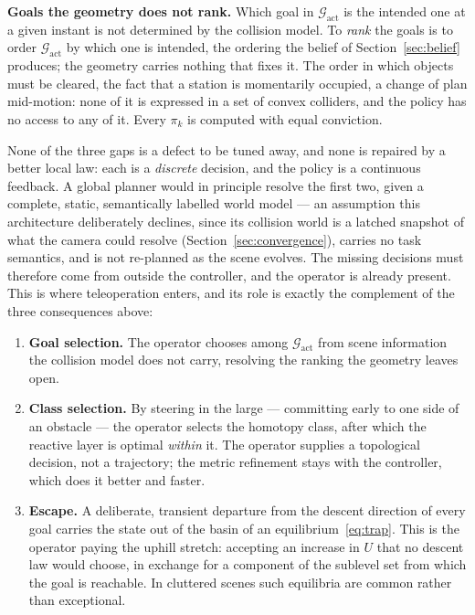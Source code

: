 \documentclass[12pt,a4paper,twoside,openright]{report}
\begin{document}
\textbf{Goals the geometry does not rank.} Which goal in $\mathcal{G}_{\text{act}}$ is the intended one at a given instant is not determined by the collision model. To \emph{rank} the goals is to order $\mathcal{G}_{\text{act}}$ by which one is intended, the ordering the belief of Section~\ref{sec:belief} produces; the geometry carries nothing that fixes it. The order in which objects must be cleared, the fact that a station is momentarily occupied, a change of plan mid-motion: none of it is expressed in a set of convex colliders, and the policy has no access to any of it. Every $\pi_k$ is computed with equal conviction.

None of the three gaps is a defect to be tuned away, and none is repaired by a better local law: each is a \emph{discrete} decision, and the policy is a continuous feedback. A global planner would in principle resolve the first two, given a complete, static, semantically labelled world model --- an assumption this architecture deliberately declines, since its collision world is a latched snapshot of what the camera could resolve (Section~\ref{sec:convergence}), carries no task semantics, and is not re-planned as the scene evolves. The missing decisions must therefore come from outside the controller, and the operator is already present. This is where teleoperation enters, and its role is exactly the complement of the three consequences above:
\begin{enumerate}[nosep]
\item \textbf{Goal selection.} The operator chooses among $\mathcal{G}_{\text{act}}$ from scene information the collision model does not carry, resolving the ranking the geometry leaves open.
\item \textbf{Class selection.} By steering in the large --- committing early to one side of an obstacle --- the operator selects the homotopy class, after which the reactive layer is optimal \emph{within} it. The operator supplies a topological decision, not a trajectory; the metric refinement stays with the controller, which does it better and faster.
\item \textbf{Escape.} A deliberate, transient departure from the descent direction of every goal carries the state out of the basin of an equilibrium~\eqref{eq:trap}. This is the operator paying the uphill stretch: accepting an increase in $U$ that no descent law would choose, in exchange for a component of the sublevel set from which the goal is reachable. In cluttered scenes such equilibria are common rather than exceptional.
\end{enumerate}
\end{document}
